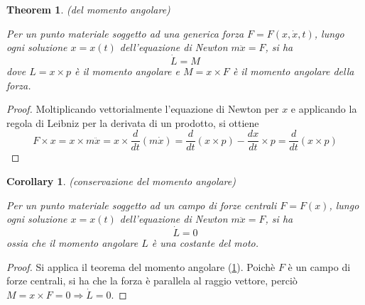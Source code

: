 \documentclass{article}
\newtheorem{theorem}{Theorem}[section]
\newtheorem{corollary}{Corollary}[theorem]
\begin{document}
            \begin{theorem}(del momento angolare)
                \label{thm:momento angolare}

                Per un punto materiale soggetto ad una generica forza $F = F(x, \dot{x}, t)$, lungo ogni soluzione $x = x(t)$ dell'equazione di Newton $m \ddot{x} = F$, si ha
                \[ \dot{L} = M \] dove $L = x \times p$ è il momento angolare e $M = x \times F $ è il momento angolare della forza.
                
            \end{theorem}
            \begin{proof}
                
                Moltiplicando vettorialmente l'equazione di Newton per $x$ e applicando la regola di Leibniz per la derivata di un prodotto, si ottiene
                \[ F \times x = x \times m \ddot{x} = x \times \frac{d}{dt}(m\dot{x}) = \frac{d}{dt}(x \times p) - \frac{dx}{dt} \times p = \frac{d}{dt}(x \times p) \]
           
            \end{proof}

            \begin{corollary}(conservazione del momento angolare)
                \label{cor:conservazione del momento angolare}

                Per un punto materiale soggetto ad un campo di forze centrali $F = F(x)$, lungo ogni soluzione $x = x(t)$ dell'equazione di Newton $m \ddot{x} = F$, si ha
                \[ \dot{L} = 0 \] ossia che il momento angolare $L$ è una costante del moto.

            \end{corollary}
            \begin{proof}

                Si applica il teorema del momento angolare (\ref{thm:momento angolare}). Poichè $F$ è un campo di forze centrali, si ha che la forza è parallela al raggio vettore,
                perciò $ M =  x \times F = 0 \Longrightarrow \dot{L} = 0 $.

            \end{proof}
\end{document}
